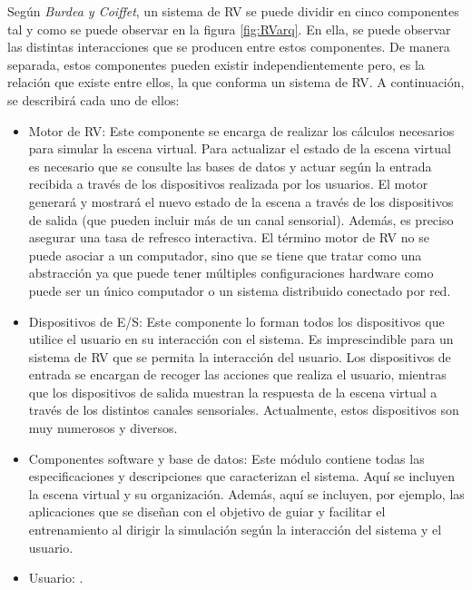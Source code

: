 Según \emph{Burdea y Coiffet}\cite{burdea2003virtual}, un sistema de \ac{RV} se puede dividir en cinco componentes tal y como se puede observar en la figura \ref{fig:RVarq}. En ella, se puede observar las distintas interacciones que se producen entre estos componentes. De manera separada, estos componentes pueden existir independientemente pero, es la relación que existe entre ellos, la que conforma un sistema de \ac{RV}. A continuación, se describirá cada uno de ellos:
\begin{itemize}
    \item Motor de \ac{RV}: Este componente se encarga de realizar los cálculos necesarios para simular la escena virtual. Para actualizar el estado de la escena virtual es necesario que se consulte las bases de datos  y actuar según la entrada recibida a través de los dispositivos realizada por los usuarios. El motor generará y mostrará el nuevo estado de la escena a través de los dispositivos de salida (que pueden incluir más de un canal sensorial). Además, es preciso asegurar una tasa de refresco interactiva. El término motor de RV no se puede asociar a un computador, sino que se tiene que tratar como una abstracción ya que puede tener múltiples configuraciones hardware como puede ser un único computador o un sistema distribuido conectado por red.
    \item Dispositivos de \ac{E/S}: Este componente lo forman todos los dispositivos que utilice el usuario en su interacción con el sistema. Es imprescindible para un sistema de \ac{RV}  que se permita la interacción del usuario. Los dispositivos de entrada se encargan de recoger las acciones que realiza el usuario, mientras que los dispositivos de salida muestran la respuesta de la escena virtual a través de los distintos canales sensoriales. Actualmente, estos dispositivos son muy numerosos y diversos.
    \item Componentes software y base de datos: Este módulo contiene todas las especificaciones y descripciones que caracterizan el sistema. Aquí se incluyen la escena virtual y su organización.  Además, aquí se incluyen, por ejemplo, las aplicaciones que se diseñan con el objetivo de guiar y facilitar el entrenamiento al dirigir la simulación según la interacción del sistema y el usuario.
    \item Usuario:  . 

\end{itemize}
